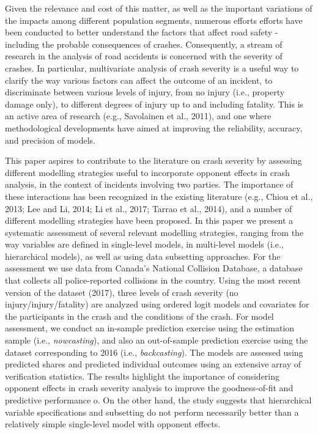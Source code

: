 \documentclass[]{elsarticle} %
\begin{document}
Given the relevance and cost of this matter, as well as the important
variations of the impacts among different population segments, numerous
efforts efforts have been conducted to better understand the factors
that affect road safety - including the probable consequences of
crashes. Consequently, a stream of research in the analysis of road
accidents is concerned with the severity of crashes. In particular,
multivariate analysis of crash severity is a useful way to clarify the
way various factors can affect the outcome of an incident, to
discriminate between various levels of injury, from no injury (i.e.,
property damage only), to different degrees of injury up to and
including fatality. This is an active area of research (e.g., Savolainen
et al., 2011), and one where methodological developments have aimed at
improving the reliability, accuracy, and precision of models.

This paper aspires to contribute to the literature on crash severity by
assessing different modelling strategies useful to incorporate opponent
effects in crash analysis, in the context of incidents involving two
parties. The importance of these interactions has been recognized in the
existing literature (e.g., Chiou et al., 2013; Lee and Li, 2014; Li et
al., 2017; Tarrao et al., 2014), and a number of different modelling
strategies have been proposed. In this paper we present a systematic
assessment of several relevant modelling strategies, ranging from the
way variables are defined in single-level models, in multi-level models
(i.e., hierarchical models), as well as using data subsetting
approaches. For the assessment we use data from Canada's National
Collision Database, a database that collects all police-reported
collisions in the country. Using the most recent version of the dataset
(2017), three levels of crash severity (no injury/injury/fatality) are
analyzed using ordered logit models and covariates for the participants
in the crash and the conditions of the crash. For model assessment, we
conduct an in-sample prediction exercise using the estimation sample
(i.e., \emph{nowcasting}), and also an out-of-sample prediction exercise
using the dataset corresponding to 2016 (i.e., \emph{backcasting}). The
models are assessed using predicted shares and predicted individual
outcomes using an extensive array of verification statistics. The
results highlight the importance of considering opponent effects in
crash severity analysis to improve the goodness-of-fit and predictive
performance o. On the other hand, the study suggests that hierarchical
variable specifications and subsetting do not perform necessarily better
than a relatively simple single-level model with opponent effects.
\end{document}
